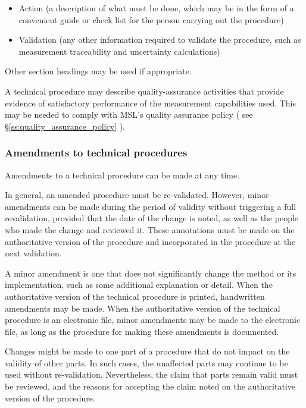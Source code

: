 \begin{itemize}
\item Action (a description of what must be done, which may be in the form of a convenient guide or check list for the person carrying out the procedure)
\item Validation (any other information required to validate the procedure, such as measurement traceability and uncertainty calculations)
\end{itemize}

Other section headings may be used if appropriate.

A technical procedure may describe quality-assurance activities that provide evidence of satisfactory performance of the measurement capabilities used.  This may be needed to comply with MSL's quality assurance policy ( see \S\ref{ss:quality_assurance_policy} ).

\subsubsection{Amendments to technical procedures}
Amendments to a technical procedure can be made at any time. 

In general, an amended procedure must be re-validated. However, minor amendments can be made during the period of validity without triggering a full revalidation, provided that the date of the change is noted, as well as the people who made the change and reviewed it. These annotations must be made on the authoritative version of the procedure and incorporated in the procedure at the next validation.

A minor amendment is one that does not significantly change the method or its implementation, such as some additional explanation or detail.  When the authoritative version of the technical procedure is printed, handwritten amendments may be made.  When the authoritative version of the technical procedure is an electronic file, minor amendments may be made to the electronic file, as long as the procedure for making these amendments is documented.

Changes might be made to one part of a procedure that do not impact on the validity of other parts. In such cases, the unaffected parts may continue to be used without re-validation. Nevertheless, the claim that parts remain valid must be reviewed, and the reasons for accepting the claim noted on the authoritative version of the procedure.


